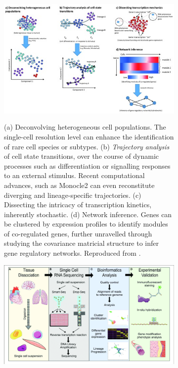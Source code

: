 \begin{figure}
     \centering
     \begin{subfigure}[p]{0.95\textwidth}
         \centering
         \includegraphics[width=\textwidth]{figures/biological_introduction/sc_purposes.jpg}
         \label{subfig:sc-applications}
         \caption[\textbf{Common applications of single-cell RNA sequencing}]{(a) Deconvolving heterogeneous cell populations. The single-cell resolution level can enhance the identification of rare cell species or subtypes. (b) \textit{Trajectory analysis} of cell state transitions, over the course of dynamic processes such as differentiation or signalling responses to an external stimulus. Recent computational advances, such as Monocle2 \autocite{qiu_etal17} can even reconstitute diverging and lineage-specific trajectories. (c) Dissecting the intricacy of transcription kinetics, inherently stochastic. (d) Network inference. Genes can be clustered by expression profiles to identify modules of co-regulated genes, further unravelled through studying the covariance matricial structure to infer gene regulatory networks. Reproduced from \autocite[Fig .1]{liu_trapnell16}.}
     \end{subfigure}
     \vfill
     \begin{subfigure}[p]{0.4\textwidth}
         \centering
         \includegraphics[width=\textwidth]{figures/biological_introduction/sc_pipeline.png}

\end{subfigure}
\end{figure}
